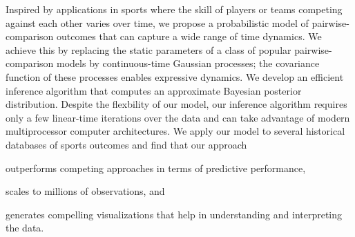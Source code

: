 Inspired by applications in sports where the skill of players or teams competing against each other varies over time, we propose a probabilistic model of pairwise-comparison outcomes that can capture a wide range of time dynamics.
We achieve this by replacing the static parameters of a class of popular pairwise-comparison models by continuous-time Gaussian processes;
the covariance function of these processes enables expressive dynamics.
We develop an efficient inference algorithm that computes an approximate Bayesian posterior distribution.
Despite the flexbility of our model, our inference algorithm requires only a few linear-time iterations over the data and can take advantage of modern multiprocessor computer architectures.
We apply our model to several historical databases of sports outcomes and find that our approach
\begin{enuminline}
	\item outperforms competing approaches in terms of predictive performance,
	\item scales to millions of observations, and
	\item generates compelling visualizations that help in understanding and interpreting the data.
\end{enuminline}
